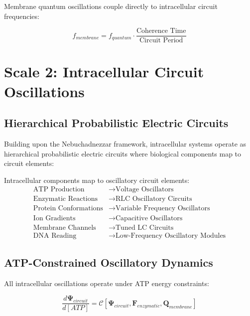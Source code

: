 \documentclass[twocolumn]{article}
\begin{document}
Membrane quantum oscillations couple directly to intracellular circuit frequencies:

\begin{equation}
f_{membrane} = f_{quantum} \cdot \frac{\text{Coherence Time}}{\text{Circuit Period}}
\end{equation}

\section{Scale 2: Intracellular Circuit Oscillations}

\subsection{Hierarchical Probabilistic Electric Circuits}

Building upon the Nebuchadnezzar framework, intracellular systems operate as hierarchical probabilistic electric circuits where biological components map to circuit elements:

\begin{definition}
Intracellular components map to oscillatory circuit elements:
\begin{align}
\text{ATP Production} &\rightarrow \text{Voltage Oscillators} \\
\text{Enzymatic Reactions} &\rightarrow \text{RLC Oscillatory Circuits} \\
\text{Protein Conformations} &\rightarrow \text{Variable Frequency Oscillators} \\
\text{Ion Gradients} &\rightarrow \text{Capacitive Oscillators} \\
\text{Membrane Channels} &\rightarrow \text{Tuned LC Circuits} \\
\text{DNA Reading} &\rightarrow \text{Low-Frequency Oscillatory Modules}
\end{align}
\end{definition}

\subsection{ATP-Constrained Oscillatory Dynamics}

All intracellular oscillations operate under ATP energy constraints:

\begin{equation}
\frac{d\mathbf{\Psi}_{circuit}}{d[ATP]} = \mathcal{C}[\mathbf{\Psi}_{circuit}, \mathbf{F}_{enzymatic}, \mathbf{Q}_{membrane}]
\end{equation}
\end{document}

